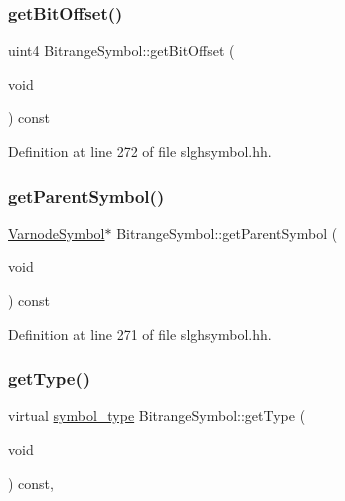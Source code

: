 \subsubsection{\texorpdfstring{getBitOffset()}{getBitOffset()}}
{\footnotesize\ttfamily uint4 Bitrange\+Symbol\+::get\+Bit\+Offset (\begin{DoxyParamCaption}\item[{void}]{ }\end{DoxyParamCaption}) const\hspace{0.3cm}{\ttfamily [inline]}}



Definition at line 272 of file slghsymbol.\+hh.

\mbox{\label{class_bitrange_symbol_a495e75ab346ccecc67873ba516749b49}} 
\subsubsection{\texorpdfstring{getParentSymbol()}{getParentSymbol()}}
{\footnotesize\ttfamily \mbox{\hyperlink{class_varnode_symbol}{Varnode\+Symbol}}$\ast$ Bitrange\+Symbol\+::get\+Parent\+Symbol (\begin{DoxyParamCaption}\item[{void}]{ }\end{DoxyParamCaption}) const\hspace{0.3cm}{\ttfamily [inline]}}



Definition at line 271 of file slghsymbol.\+hh.

\mbox{\label{class_bitrange_symbol_aa8c892a1391e81d799d56cfc2318a6fd}} 
\subsubsection{\texorpdfstring{getType()}{getType()}}
{\footnotesize\ttfamily virtual \mbox{\hyperlink{class_sleigh_symbol_aba70f7f332fd63488c5ec4bd7807db41}{symbol\+\_\+type}} Bitrange\+Symbol\+::get\+Type (\begin{DoxyParamCaption}\item[{void}]{ }\end{DoxyParamCaption}) const\hspace{0.3cm}{\ttfamily [inline]}, {\ttfamily [virtual]}}



